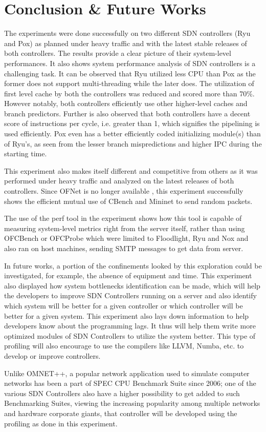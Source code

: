 \chapter{Conclusion \& Future Works} 

The experiments were done successfully on two different SDN controllers (Ryu and Pox) as planned under heavy traffic and with the latest stable releases of both controllers. The results provide a clear picture of their system-level performances. It also shows system performance analysis of SDN controllers is a challenging task.  It can be observed that Ryu utilized less CPU than Pox as the former does not support multi-threading while the later does. The utilization of first level cache by both the controllers was reduced and scored more than 70\%. However notably, both controllers efficiently use other higher-level caches and branch predictors. Further is also observed that both controllers have a decent score of instructions per cycle, i.e. greater than 1, which signifies the pipelining is used efficiently. Pox even has a better efficiently coded initializing module(s) than of Ryu's, as seen from the lesser branch mispredictions and higher IPC during the starting time.

This experiment also makes itself different and competitive from others as it was performed under heavy traffic and analyzed on the latest releases of both controllers. Since OFNet is no longer available \cite{}, this experiment successfully shows the efficient mutual use of CBench and Mininet to send random packets.

The use of the perf tool in the experiment shows how this tool is capable of measuring system-level metrics right from the server itself, rather than using OFCBench or OFCProbe which were limited to Floodlight, Ryu and Nox and also ran on host machines, sending SMTP messages to get data from server.

In future works, a portion of the confinements looked by this exploration could be investigated, for example, the absence of equipment and time. This experiment also displayed how system bottlenecks identification can be made, which will help the developers to improve SDN Controllers running on a server and also identify which system will be better for a given controller or which controller will be better for a given system. This experiment also lays down information to help developers know about the programming lags. It thus will help them write more optimized modules of SDN Controllers to utilize the system better. This type of profiling will also encourage to use the compilers like LLVM, Numba, etc. to develop or improve controllers.

Unlike OMNET++, a popular network application used to simulate computer networks has been a part of SPEC CPU Benchmark Suite since 2006; one of the various SDN Controllers also have a higher possibility to get added to such Benchmarking Suites, viewing the increasing popularity among multiple networks and hardware corporate giants, that controller will be developed using the profiling as done in this experiment.